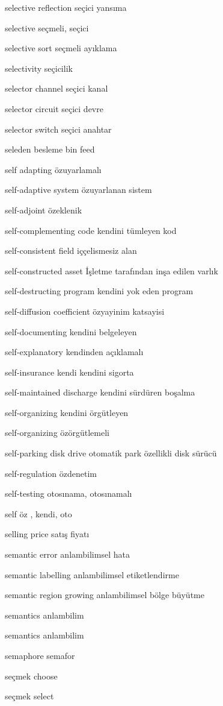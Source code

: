 \documentclass[12pt,fleqn]{article}\usepackage{../../common}
\begin{document}
selective reflection seçici yansıma

selective seçmeli, seçici

selective sort seçmeli ayıklama

selectivity seçicilik

selector channel seçici kanal

selector circuit seçici devre

selector switch seçici anahtar

seleden besleme bin feed

self adapting özuyarlamalı

self-adaptive system özuyarlanan sistem

self-adjoint özeklenik

self-complementing code kendini tümleyen kod

self-consistent field iççelismesiz alan

self-constructed asset İşletme tarafından inşa edilen varlık

self-destructing program kendini yok eden program

self-diffusion coefficient özyayinim katsayisi

self-documenting kendini belgeleyen

self-explanatory kendinden açıklamalı

self-insurance kendi kendini sigorta

self-maintained discharge kendini sürdüren boşalma

self-organizing kendini örgütleyen

self-organizing özörgütlemeli

self-parking disk drive otomatik park özellikli disk sürücü

self-regulation özdenetim

self-testing otosınama, otosınamalı

self öz , kendi, oto

selling price satış fiyatı

semantic error anlambilimsel hata

semantic labelling anlambilimsel etiketlendirme

semantic region growing anlambilimsel bölge büyütme

semantics anlambilim

semantics anlambilim

semaphore semafor

seçmek choose

seçmek select
\end{document}

